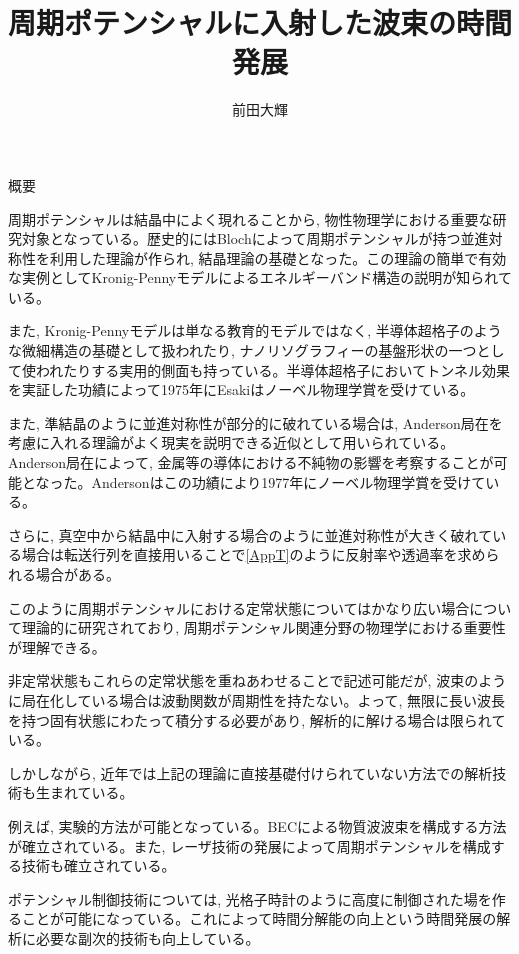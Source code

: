 \documentclass[a4paper, lualatex]{bxjsarticle}
\title{周期ポテンシャルに入射した波束の時間発展}
\author{前田大輝}
\begin{document}
    \maketitle
    \newpage
    \tableofcontents
    \newpage

\newpage

\begin{section}{概要}
    \par 周期ポテンシャルは結晶中によく現れる\cite{Kittel}ことから, 物性物理学における重要な研究対象となっている。歴史的にはBloch\cite{Bloch}によって周期ポテンシャルが持つ並進対称性を利用した理論が作られ, 結晶理論の基礎となった。この理論の簡単で有効な実例としてKronig-Pennyモデル\cite{KP}によるエネルギーバンド構造の説明が知られている。
    \par また, Kronig-Pennyモデルは単なる教育的モデルではなく, 半導体超格子\cite{Esaki}のような微細構造の基礎として扱われたり, ナノリソグラフィーの基盤形状の一つとして使われたりする\cite{Szmulowicz}実用的側面も持っている。半導体超格子においてトンネル効果を実証した功績によって1975年にEsakiはノーベル物理学賞を受けている\cite{nobelEsaki}。
    \par また, 準結晶のように並進対称性が部分的に破れている場合は, Anderson局在\cite{Nagaoka}を考慮に入れる理論がよく現実を説明できる近似として用いられている。Anderson局在によって, 金属等の導体における不純物の影響を考察することが可能となった。Andersonはこの功績により1977年にノーベル物理学賞を受けている\cite{nobelAnderson}。
    \par さらに, 真空中から結晶中に入射する場合のように並進対称性が大きく破れている場合は転送行列を直接用いることで\ref{AppT}のように反射率や透過率を求められる場合がある。
    \par このように周期ポテンシャルにおける定常状態についてはかなり広い場合について理論的に研究されており, 周期ポテンシャル関連分野の物理学における重要性が理解できる。
    \par 非定常状態もこれらの定常状態を重ねあわせることで記述可能\cite{Koide}だが, 波束のように局在化している場合は波動関数が周期性を持たない。よって, 無限に長い波長を持つ固有状態にわたって積分する必要があり, 解析的に解ける場合は限られている。
    \par しかしながら, 近年では上記の理論に直接基礎付けられていない方法での解析技術も生まれている。
    \par 例えば, 実験的方法が可能となっている。BECによる物質波波束を構成する方法\cite{Anker}が確立されている。また, レーザ技術の発展によって周期ポテンシャルを構成する技術\cite{Anker}も確立されている。
    \par ポテンシャル制御技術については, 光格子時計\cite{Katori}のように高度に制御された場を作ることが可能になっている。これによって時間分解能の向上という時間発展の解析に必要な副次的技術も向上している。

\end{section}
\end{document}
